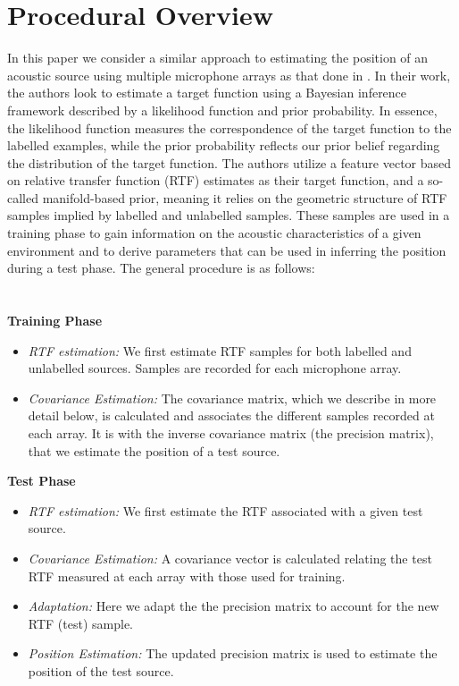 \documentclass{article}
\begin{document}
\section{Procedural Overview} 
In this paper we consider a similar approach to estimating the position of an acoustic source using multiple microphone arrays as that done in \cite{LG_semisupervisedSourceLocalization}. In their work, the authors look to estimate a target function using a Bayesian inference framework described by a likelihood function and prior probability. In essence, the likelihood function measures the correspondence of the target function to the labelled examples, while the prior probability reflects our prior belief regarding the distribution of the target function. The authors utilize a feature vector based on relative transfer function (RTF) estimates as their target function, and a so-called manifold-based prior, meaning it relies on the geometric structure of RTF samples implied by labelled and unlabelled samples. These samples are used in a training phase to gain information on the acoustic characteristics of a given environment and to derive parameters that can be used in inferring the position during a test phase. The general procedure is as follows:\\\\\\ \textbf{Training Phase}
\begin{itemize}
  \item \textit{RTF estimation:} We first estimate RTF samples for both labelled and unlabelled sources. Samples are recorded for each microphone array.
  \item \textit{Covariance Estimation:} The covariance matrix, which we describe in more detail below, is calculated and associates the different samples recorded at each array. It is with the inverse covariance matrix (the precision matrix), that we estimate the position of a test source.
\end{itemize}
\textbf{Test Phase}
\begin{itemize}
  \item \textit{RTF estimation:} We first estimate the RTF associated with a given test source.
  \item \textit{Covariance Estimation:} A covariance vector is calculated relating the test RTF measured at each array with those used for training. 
  \item \textit{Adaptation:} Here we adapt the the precision matrix to account for the new RTF (test) sample. 
  \item \textit{Position Estimation:} The updated precision matrix is used to estimate the position of the test source.
\end{itemize}
\end{document}
